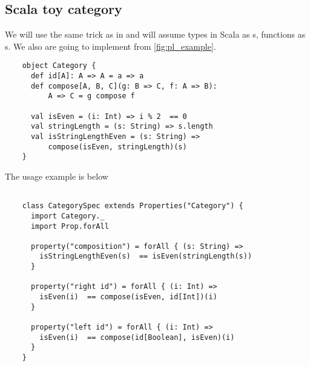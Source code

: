 \subsection{\textbf{Scala} toy category}
\begin{example}
  \label{ex:scalacategory}

  We will use the same trick as in  and
  will assume 
  types in Scala as s, 
  functions as s.
  We also are going to implement
   from \cref{fig:pl_example}.

  \begin{verbatim}
    object Category {
      def id[A]: A => A = a => a
      def compose[A, B, C](g: B => C, f: A => B): 
          A => C = g compose f 
      
      val isEven = (i: Int) => i % 2  == 0
      val stringLength = (s: String) => s.length
      val isStringLengthEven = (s: String) => 
          compose(isEven, stringLength)(s)
    }
  \end{verbatim}

  The usage example is below
  \begin{verbatim}
    
    class CategorySpec extends Properties("Category") {
      import Category._
      import Prop.forAll
      
      property("composition") = forAll { (s: String) =>
        isStringLengthEven(s)  == isEven(stringLength(s))
      }
      
      property("right id") = forAll { (i: Int) =>
        isEven(i)  == compose(isEven, id[Int])(i)
      }
      
      property("left id") = forAll { (i: Int) =>
        isEven(i)  == compose(id[Boolean], isEven)(i)
      }
    }
  \end{verbatim}
\end{example}


